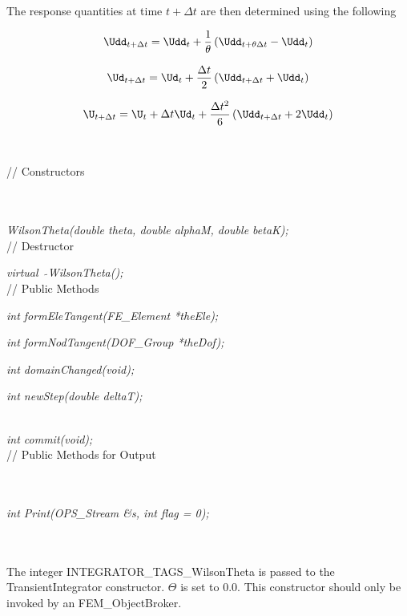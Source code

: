 \noindent The response quantities at time $t + \Delta t$ are then
determined using the following

\[
\Udd_{t + \Delta t} = \Udd_t + \frac{1}{\theta} \left( \Udd_{t +
\theta \Delta t} - \Udd_t \right)
\]

\[ \Ud_{t + \Delta t} = \Ud_t + \frac{\Delta t}{2}\left( \Udd_{t +
\Delta t} + \Udd_t \right) \]

\[ \U_{t + \Delta t} = \U_t + \Delta t\Ud_t + \frac{\Delta t^2}{6}\left(
\Udd_{t + \Delta t} + 2 \Udd_t \right) \]
\\

\pagebreak
{} \\
// Constructors 

\\ 
\\ 
{\em WilsonTheta(double theta, double alphaM, double betaK);}\\ 

// Destructor 

{\em virtual~ $\tilde{}$WilsonTheta();}\\ 

// Public Methods 

{\em int formEleTangent(FE\_Element *theEle);} 

{\em int formNodTangent(DOF\_Group *theDof);} 

{\em int domainChanged(void);}

{\em int newStep(double deltaT);}

 \\ 
{\em int commit(void);}\\ 

// Public Methods for Output

\\ 
\\ 
{\em int Print(OPS_Stream \&s, int flag = 0);}


 \\
\\ 
The integer INTEGRATOR\_TAGS\_WilsonTheta is passed to the TransientIntegrator
constructor. $\Theta$ is set to 0.0. This constructor should only be
invoked by an FEM\_ObjectBroker. \\



